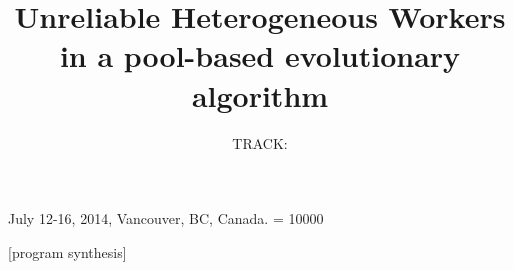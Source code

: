 \documentclass{sig-alternate}
\begin{document}
\title{ Unreliable Heterogeneous Workers in a pool-based evolutionary algorithm}
\subtitle{TRACK: }

 {July 12-16, 2014, Vancouver, BC, Canada.}
    \widowpenalty = 10000

%
%

\maketitle              %

\begin{abstract}
\end{abstract}

[program synthesis]

\keywords{}
%
\end{document}
